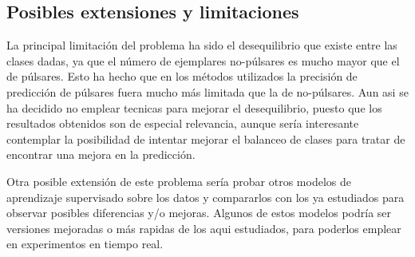\documentclass[a4paper]{article} %
\begin{document}
\subsection{Posibles extensiones y limitaciones}
La principal limitación del problema ha sido el desequilibrio que existe entre las clases dadas, ya que el número de ejemplares no-púlsares es mucho mayor que el de púlsares. Esto ha hecho que en los métodos utilizados la precisión de predicción de púlsares fuera mucho más limitada que la de no-púlsares. Aun asi se ha decidido no emplear tecnicas para mejorar el desequilibrio, puesto que los resultados obtenidos son de especial relevancia, aunque sería interesante contemplar la posibilidad de intentar mejorar el balanceo de clases para tratar de encontrar una mejora en la predicción. \vspace{5mm}

Otra posible extensión de este problema sería probar otros modelos de aprendizaje supervisado sobre los datos y compararlos con los ya estudiados para observar posibles diferencias y/o mejoras. Algunos de estos modelos podría ser versiones mejoradas o más rapidas de los aqui estudiados, para poderlos emplear en experimentos en tiempo real. 

\newpage


\nocite{*}
\printbibliography
\end{document}
